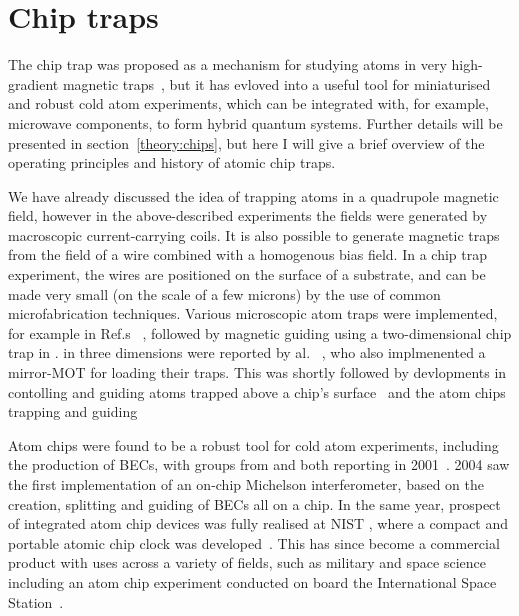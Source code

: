 \section{Chip traps}


The chip trap was proposed as a mechanism for studying atoms in very
high-gradient magnetic traps~\cite{PhysRevA.52.4004}, but it has evloved into a
useful tool for miniaturised and robust cold atom experiments, which can be
integrated with, for example, microwave components, to form hybrid quantum
systems. Further details will be presented in section~\ref{theory:chips}, but
here I will give a brief overview of the operating principles and history of
atomic chip traps.

We have already discussed the idea of trapping atoms in a quadrupole magnetic
field, however in the above-described experiments the fields were generated by
macroscopic current-carrying coils. It is also possible to generate magnetic
traps from the field of a wire combined with a homogenous bias field. In a chip
trap experiment, the wires are positioned on the surface of a substrate, and
can be made very small (on the scale of a few microns) by the use of common
microfabrication techniques. Various microscopic atom traps were implemented,
for example in Ref.s~\cite{PhysRevLett.80.1634, PhysRevLett.81.5310,
Drindic1998}  ,
followed by magnetic guiding using a two-dimensional chip trap in
 . %
in three dimensions were reported by  al.~\cite{Reichel1999}
, who also implmenented a mirror-MOT for loading their traps. This was
shortly followed by devlopments in contolling and guiding atoms trapped above a
chip's surface~\cite{Folman2000} and the 
%
atom chips trapping and guiding \cite{Folman2000}

Atom chips were found to be a robust tool for cold atom experiments, including
the production of BECs, with groups from  and 
both reporting   in 2001~\cite{Hansel2001,
dtt2001}. 2004 saw the first implementation of an on-chip Michelson
interferometer, based on the creation, splitting and guiding of BECs all on a
chip. In the same year, prospect of integrated atom chip devices was fully
realised at NIST , where a compact and portable atomic chip clock
was developed~\cite{Knappe2004}. This has since become a commercial product
with uses across a variety of fields, such as military and space
science~\cite{RAMIREZMARTINEZ2011247} including an atom chip experiment
conducted on board the International Space Station~\cite{Frye2021}.

